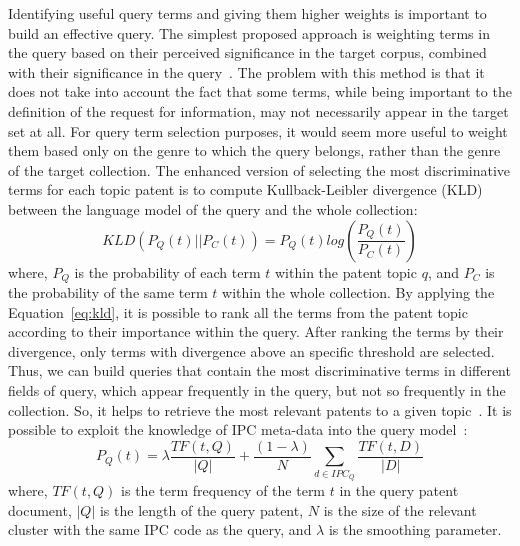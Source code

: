 Identifying useful query terms and giving them higher weights is important to build an effective query. The simplest proposed approach is weighting terms in the query based on their perceived significance in the target corpus, combined with their significance in the query~\citep{itoh2003term}. The problem with this method is that it does not take into account the fact that some terms, while being important to the definition of the request for information, may not necessarily appear in the target set at all. For query term selection purposes, it would seem more useful to weight them based only on the genre to which the query belongs, rather than the genre of the target collection. The enhanced version of selecting the most discriminative terms for each topic patent is to compute Kullback-Leibler divergence (KLD) between the language model of the query and the whole collection:
\begin{equation}
\label{eq:kld}
 KLD(P_{Q}(t)||P_{C}(t)) = P_{Q}(t)log(\frac{P_{Q}(t)}{P_{C}(t)})  
\end{equation}
where, $ P_{Q} $ is the probability of each term $ t $ within the patent topic $ q $, and $ P_{C} $ is the probability of the same term $ t $ within the whole collection. 
By applying the Equation~\ref{eq:kld}, it is possible to rank all the terms from the patent topic according to their importance within the query. After ranking the terms by their divergence, only terms with divergence above an specific threshold are selected. Thus, we can build queries that contain the most discriminative terms in different fields of query, which appear frequently in the query, but not so frequently in the collection. So, it helps to retrieve the most relevant patents to a given topic~\citep{perez2010using}. It is possible to exploit the knowledge of IPC meta-data into the query model~\citep{mahdabi2011building}:
\begin{equation}
\label{eq:IPCmodel}
 P_{Q}(t) = \lambda\frac{TF(t,Q)}{|Q|}+\frac{(1-\lambda)}{N}\sum_{d\in IPC_{Q}}\frac{TF(t,D)}{|D|}  
\end{equation}
where, $ TF(t,Q) $ is the term frequency of the term $ t $ in the query patent document, $ |Q| $ is the length of the query patent, $ N $ is the size of the relevant cluster with the same IPC code as the query, and $ \lambda $ is the smoothing parameter.
